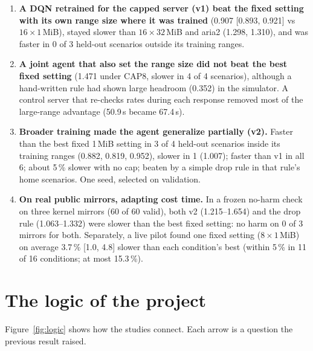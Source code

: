 \begin{enumerate}
\item \textbf{A DQN retrained for the capped server (v1) beat the fixed setting with its own range size where it was trained} (0.907 [0.893, 0.921] vs $16\times1$\,MiB), stayed slower than $16\times32$\,MiB and aria2 (1.298, 1.310), and was faster in 0 of 3 held-out scenarios outside its training ranges.
\item \textbf{A joint agent that also set the range size did not beat the best fixed setting} (1.471 under CAP8, slower in 4 of 4 scenarios), although a hand-written rule had shown large headroom (0.352) in the simulator. A control server that re-checks rates during each response removed most of the large-range advantage (50.9\,s became 67.4\,s).
\item \textbf{Broader training made the agent generalize partially (v2).} Faster than the best fixed 1\,MiB setting in 3 of 4 held-out scenarios inside its training ranges (0.882, 0.819, 0.952), slower in 1 (1.007); faster than v1 in all 6; about 5\,\% slower with no cap; beaten by a simple drop rule in that rule's home scenarios. One seed, selected on validation.
\item \textbf{On real public mirrors, adapting cost time.} In a frozen no-harm check on three kernel mirrors (60 of 60 valid), both v2 (1.215--1.654) and the drop rule (1.063--1.332) were slower than the best fixed setting: no harm on 0 of 3 mirrors for both. Separately, a live pilot found one fixed setting ($8\times1$\,MiB) on average 3.7\,\% [1.0, 4.8] slower than each condition's best (within 5\,\% in 11 of 16 conditions; at most 15.3\,\%).
\end{enumerate}

\section{The logic of the project}
Figure~\ref{fig:logic} shows how the studies connect. Each arrow is a question the previous result raised.

